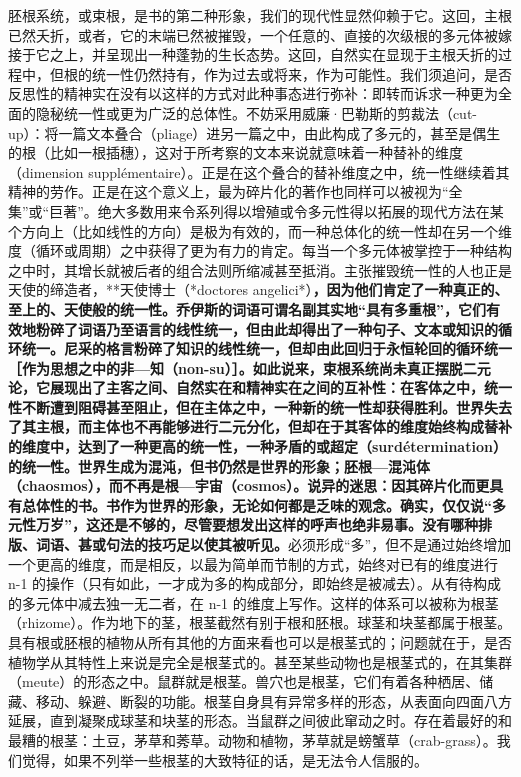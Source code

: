 \documentclass[12pt,a4paper]{article}
\begin{document}
胚根系统，或束根，是书的第二种形象，我们的现代性显然仰赖于它。这回，主根已然夭折，或者，它的末端已然被摧毁，一个任意的、直接的次级根的多元体被嫁接于它之上，并呈现出一种蓬勃的生长态势。这回，自然实在显现于主根夭折的过程中，但根的统一性仍然持有，作为过去或将来，作为可能性。我们须追问，是否反思性的精神实在没有以这样的方式对此种事态进行弥补：即转而诉求一种更为全面的隐秘统一性或更为广泛的总体性。不妨采用威廉·巴勒斯的剪裁法（cut-up）：将一篇文本叠合（pliage）进另一篇之中，由此构成了多元的，甚至是偶生的根（比如一根插穗），这对于所考察的文本来说就意味着一种替补的维度（dimension supplémentaire）。正是在这个叠合的替补维度之中，统一性继续着其精神的劳作。正是在这个意义上，最为碎片化的著作也同样可以被视为“全集”或“巨著”。绝大多数用来令系列得以增殖或令多元性得以拓展的现代方法在某个方向上（比如线性的方向）是极为有效的，而一种总体化的统一性却在另一个维度（循环或周期）之中获得了更为有力的肯定。每当一个多元体被掌控于一种结构之中时，其增长就被后者的组合法则所缩减甚至抵消。主张摧毁统一性的人也正是天使的缔造者，**天使博士（*doctores angelici*）\textbf{，因为他们肯定了一种真正的、至上的、天使般的统一性。乔伊斯的词语可谓名副其实地“具有多重根”，它们有效地粉碎了词语乃至语言的线性统一，但由此却得出了一种句子、文本或知识的循环统一。尼采的格言粉碎了知识的线性统一，但却由此回归于永恒轮回的循环统一［作为思想之中的非—知（non-su）］。如此说来，束根系统尚未真正摆脱二元论，它展现出了主客之间、自然实在和精神实在之间的互补性：在客体之中，统一性不断遭到阻碍甚至阻止，但在主体之中，一种新的统一性却获得胜利。世界失去了其主根，而主体也不再能够进行二元分化，但却在于其客体的维度始终构成替补的维度中，达到了一种更高的统一性，一种矛盾的或超定（surdétermination）的统一性。世界生成为混沌，但书仍然是世界的形象；胚根—混沌体（chaosmos），而不再是根—宇宙（cosmos）。说异的迷思：因其碎片化而更具有总体性的书。书作为世界的形象，无论如何都是乏味的观念。确实，仅仅说“多元性万岁”，这还是不够的，尽管要想发出这样的呼声也绝非易事。没有哪种排版、词语、甚或句法的技巧足以使其被听见。}必须形成“多”，但不是通过始终增加一个更高的维度，而是相反，以最为简单而节制的方式，始终对已有的维度进行 n-1 的操作（只有如此，一才成为多的构成部分，即始终是被减去）。从有待构成的多元体中减去独一无二者，在 n-1 的维度上写作。这样的体系可以被称为根茎（rhizome）。作为地下的茎，根茎截然有别于根和胚根。球茎和块茎都属于根茎。具有根或胚根的植物从所有其他的方面来看也可以是根茎式的；问题就在于，是否植物学从其特性上来说是完全是根茎式的。甚至某些动物也是根茎式的，在其集群（meute）的形态之中。鼠群就是根茎。兽穴也是根茎，它们有着各种栖居、储藏、移动、躲避、断裂的功能。根茎自身具有异常多样的形态，从表面向四面八方延展，直到凝聚成球茎和块茎的形态。当鼠群之间彼此窜动之时。存在着最好的和最糟的根茎：土豆，茅草和莠草。动物和植物，茅草就是螃蟹草（crab-grass）。我们觉得，如果不列举一些根茎的大致特征的话，是无法令人信服的。
\end{document}
